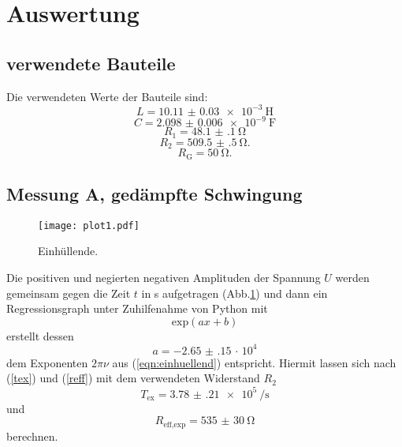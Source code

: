 \section{Auswertung}
\label{sec:Auswertung}

\subsection{verwendete Bauteile}

Die verwendeten Werte der Bauteile sind:
\begin{equation*}
  L = \SI{10.11(3)e-3}{\henry}
\end{equation*}
\begin{equation*}
  C = \SI{2.098(6)e-9}{\farad}
\end{equation*}
\begin{equation*}
  R_{\text{1}} = \SI{48.1(1)}{\ohm}
\end{equation*}
\begin{equation*}
  R_{\text{2}} = \SI{509.5(5)}{\ohm}.
\end{equation*}
\begin{equation*}
  R_{\text{G}} = \SI{50}{\ohm}.
\end{equation*}

\subsection{Messung A, gedämpfte Schwingung}

\begin{figure}
  \centering
  \texttt{[image: plot1.pdf]}
  \caption{Einhüllende.}
  \label{fig:plot1}
\end{figure}
 Die positiven und negierten negativen Amplituden der Spannung $U$ werden gemeinsam
gegen die Zeit $t$ in s aufgetragen (Abb.\ref{fig:plot1}) und dann ein Regressionsgraph
unter Zuhilfenahme von Python mit
\begin{equation*}
  \text{exp}(ax+b)
\end{equation*}
erstellt dessen
\begin{equation*}
   a = \num{-2.65(15)}\, \cdot\, 10^{4}
\end{equation*}
dem Exponenten $2\pi\nu$ aus (\ref{eqn:einhuellend}) entspricht.
Hiermit lassen sich nach (\ref{tex}) und (\ref{reff}) mit dem verwendeten Widerstand $R_{\text{2}}$
\begin{equation*}
   T_{\text{ex}} = \SI{3.78(21)e5}{\per\second}
\end{equation*}
und
\begin{equation*}
R_{\text{eff,exp}} = \SI{535(30)}{\ohm}
\end{equation*}
berechnen.

